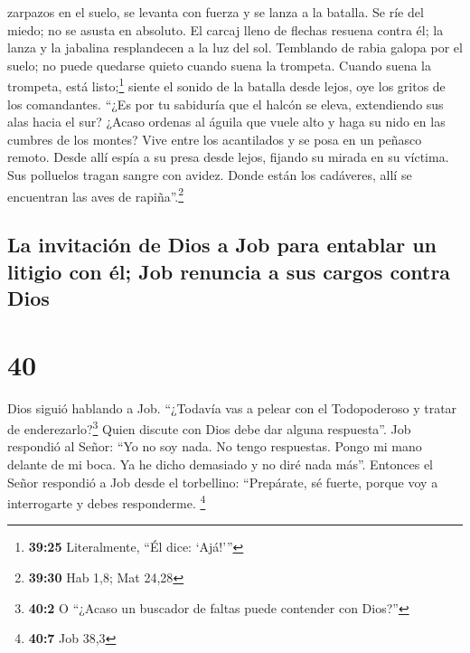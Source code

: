 zarpazos en el suelo, se levanta con fuerza y se lanza a la batalla.
 Se ríe del miedo; no se asusta en absoluto.
 El carcaj lleno de flechas resuena contra él; la lanza y
la jabalina resplandecen a la luz del sol.  Temblando de
rabia galopa por el suelo; no puede quedarse quieto cuando suena la
trompeta.  Cuando suena la trompeta, está
listo;\footnote{\textbf{39:25} Literalmente, ``Él dice: `Ajá!'''} siente
el sonido de la batalla desde lejos, oye los gritos de los comandantes.
 ``¿Es por tu sabiduría que el halcón se eleva,
extendiendo sus alas hacia el sur?  ¿Acaso ordenas al
águila que vuele alto y haga su nido en las cumbres de los montes?
 Vive entre los acantilados y se posa en un peñasco
remoto.  Desde allí espía a su presa desde lejos, fijando
su mirada en su víctima. Sus polluelos tragan sangre con avidez.
 Donde están los cadáveres, allí se encuentran las aves
de rapiña''.\footnote{\textbf{39:30} Hab 1,8; Mat 24,28}

\hypertarget{la-invitaciuxf3n-de-dios-a-job-para-entablar-un-litigio-con-uxe9l-job-renuncia-a-sus-cargos-contra-dios}{%
\subsection{La invitación de Dios a Job para entablar un litigio con él;
Job renuncia a sus cargos contra
Dios}\label{la-invitaciuxf3n-de-dios-a-job-para-entablar-un-litigio-con-uxe9l-job-renuncia-a-sus-cargos-contra-dios}}

\hypertarget{section-39}{%
\section{40}\label{section-39}}

 Dios siguió hablando a Job.  ``¿Todavía vas
a pelear con el Todopoderoso y tratar de enderezarlo?\footnote{\textbf{40:2}
  O ``¿Acaso un buscador de faltas puede contender con Dios?''} Quien
discute con Dios debe dar alguna respuesta''.  Job
respondió al Señor:  ``Yo no soy nada. No tengo
respuestas. Pongo mi mano delante de mi boca.  Ya he dicho
demasiado y no diré nada más''.  Entonces el Señor
respondió a Job desde el torbellino:  ``Prepárate, sé
fuerte, porque voy a interrogarte y debes responderme. \footnote{\textbf{40:7}
  Job 38,3}

